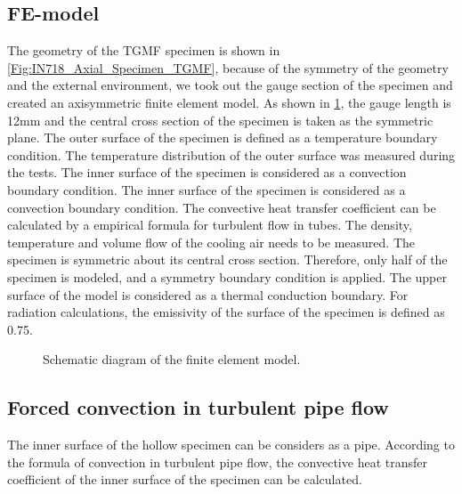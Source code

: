 \subsection{FE-model}
\noindent
The geometry of the TGMF specimen is shown in \ref{Fig:IN718_Axial_Specimen_TGMF}, because of the symmetry of the geometry and the external environment, we took out the gauge section of the specimen and created an axisymmetric finite element model. As shown in \ref{Fig:FE_model}, the gauge length is 12mm and the central cross section of the specimen is taken as the symmetric plane.
The outer surface of the specimen is defined as a temperature boundary condition. The temperature distribution of the outer surface was measured during the tests. The inner surface of the specimen is considered as a convection boundary condition. The inner surface of the specimen is considered as a convection boundary condition. The convective heat transfer coefficient can be calculated by a empirical formula for turbulent flow in tubes. The density, temperature and volume flow of the cooling air needs to be measured. The specimen is symmetric about its central cross section. Therefore, only half of the specimen is modeled, and a symmetry boundary condition is applied.
The upper surface of the model is considered as a thermal conduction boundary. For radiation calculations, the emissivity of the surface of the specimen is defined as 0.75.

\begin{figure}[!htp]
\caption{Schematic diagram of the finite element model.}
\label{Fig:FE_model}
\end{figure}

\subsection{Forced convection in turbulent pipe flow}
The inner surface of the hollow specimen can be considers as a pipe.
According to the formula of convection in turbulent pipe flow, the convective heat transfer coefficient of the inner surface of the specimen can be calculated.

